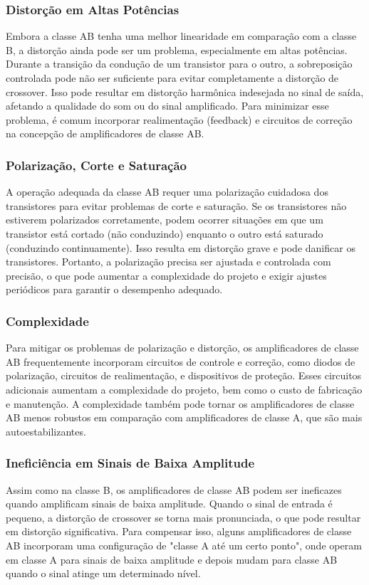 \subsubsection{Distorção em Altas Potências}

Embora a classe AB tenha uma melhor linearidade em comparação com a classe B, a distorção ainda pode ser um problema, especialmente em altas potências. Durante a transição da condução de um transistor para o outro, a sobreposição controlada pode não ser suficiente para evitar completamente a distorção de crossover. Isso pode resultar em distorção harmônica indesejada no sinal de saída, afetando a qualidade do som ou do sinal amplificado. Para minimizar esse problema, é comum incorporar realimentação (feedback) e circuitos de correção na concepção de amplificadores de classe AB.

\subsubsection{Polarização, Corte e Saturação}

A operação adequada da classe AB requer uma polarização cuidadosa dos transistores para evitar problemas de corte e saturação. Se os transistores não estiverem polarizados corretamente, podem ocorrer situações em que um transistor está cortado (não conduzindo) enquanto o outro está saturado (conduzindo continuamente). Isso resulta em distorção grave e pode danificar os transistores. Portanto, a polarização precisa ser ajustada e controlada com precisão, o que pode aumentar a complexidade do projeto e exigir ajustes periódicos para garantir o desempenho adequado.

\subsubsection{Complexidade}

Para mitigar os problemas de polarização e distorção, os amplificadores de classe AB frequentemente incorporam circuitos de controle e correção, como diodos de polarização, circuitos de realimentação, e dispositivos de proteção. Esses circuitos adicionais aumentam a complexidade do projeto, bem como o custo de fabricação e manutenção. A complexidade também pode tornar os amplificadores de classe AB menos robustos em comparação com amplificadores de classe A, que são mais autoestabilizantes.

\subsubsection{Ineficiência em Sinais de Baixa Amplitude}

Assim como na classe B, os amplificadores de classe AB podem ser ineficazes quando amplificam sinais de baixa amplitude. Quando o sinal de entrada é pequeno, a distorção de crossover se torna mais pronunciada, o que pode resultar em distorção significativa. Para compensar isso, alguns amplificadores de classe AB incorporam uma configuração de "classe A até um certo ponto", onde operam em classe A para sinais de baixa amplitude e depois mudam para classe AB quando o sinal atinge um determinado nível.